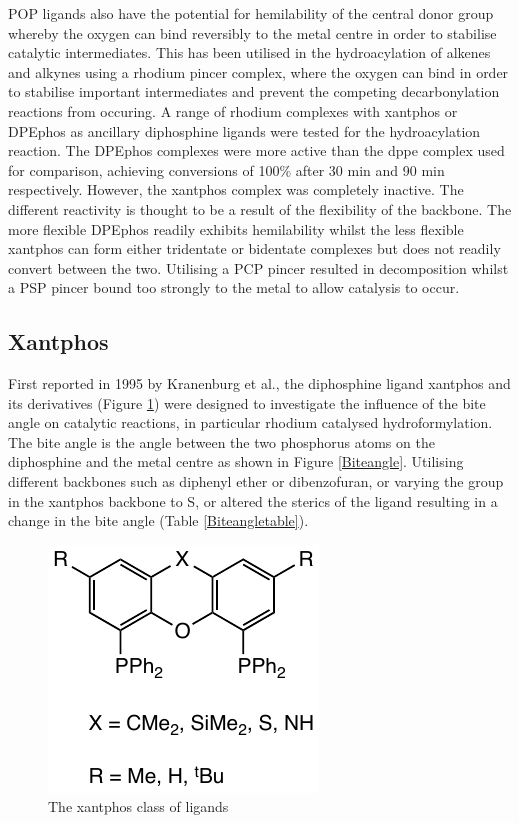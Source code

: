 POP ligands also have the potential for hemilability of the central donor group whereby the oxygen can bind reversibly to the metal centre in order to stabilise catalytic intermediates. This has been utilised in the hydroacylation of alkenes and alkynes using a rhodium pincer complex, where the oxygen can bind in order to stabilise important intermediates and prevent the competing decarbonylation reactions from occuring.\cite{Moxham2006, Moxham2008, Pawley2010}  A range of rhodium complexes with \gls{xantphos} or \gls{DPEphos} as ancillary diphosphine ligands were tested for the hydroacylation reaction.\cite{Moxham2006}  The \gls{DPEphos} complexes were more active than the \gls{dppe} complex used for comparison, achieving conversions of 100\% after 30 min and 90 min respectively.  However, the xantphos complex was completely inactive.  The different reactivity is thought to be a result of the flexibility of the backbone.\cite{Pawley2010}  The more flexible \gls{DPEphos} readily exhibits hemilability whilst the less flexible xantphos can form either tridentate or bidentate complexes but does not readily convert between the two.\cite{Moxham2006, Pawley2010}  Utilising a PCP pincer resulted in decomposition whilst a PSP pincer bound too strongly to the metal to allow catalysis to occur.\cite{Moxham2008}

\subsection{Xantphos}
	
First reported in 1995 by Kranenburg et al.,\cite{Kranenburg1995} the diphosphine ligand \gls{xantphos} and its derivatives (Figure \ref{Xantphosligandsintro}) were designed to investigate the influence of the bite angle on catalytic reactions, in particular rhodium catalysed hydroformylation.  The bite angle is the angle between the two phosphorus atoms on the diphosphine and the metal centre as shown in Figure \ref{Biteangle}. Utilising different backbones such as diphenyl ether or dibenzofuran, or varying the group in the xantphos backbone to S,  or  altered the sterics of the ligand resulting in a change in the bite angle (Table \ref{Biteangletable}).\cite{Kranenburg1995} 

\begin{figure}[ht]
\centering
\includegraphics[]{../Figures/Xantphos.pdf}
\caption[The xantphos class of ligands]{The xantphos class of ligands}
\label{Xantphosligandsintro}
\end{figure}

